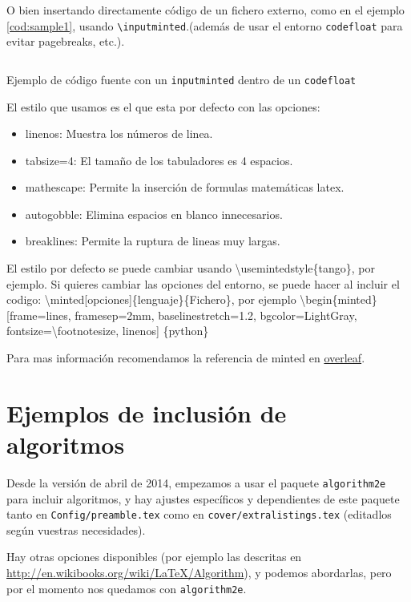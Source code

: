 O bien insertando directamente código de un fichero externo, como en el ejemplo
\ref{cod:sample1}, usando \texttt{\textbackslash{}inputminted}.(además de usar
el entorno \texttt{codefloat} para evitar pagebreaks, etc.).

\begin{codefloat}
\inputminted{c}{appendix/function.c}
\caption{Ejemplo de código fuente con un \texttt{inputminted} dentro
de un \texttt{codefloat}}
\label{cod:sample1}
\end{codefloat}

El estilo que usamos es el que esta por defecto con las opciones:
\begin{itemize}
  \item linenos: Muestra los números de linea.
  \item tabsize=4: El tamaño de los tabuladores es 4 espacios.
  \item mathescape: Permite la inserción de formulas matemáticas latex.
  \item autogobble: Elimina espacios en blanco innecesarios.
  \item breaklines: Permite la ruptura de lineas muy largas.
\end{itemize}

El estilo por defecto se puede cambiar usando
\textbackslash{}{usemintedstyle\{tango\}}, por ejemplo. Si quieres cambiar las
opciones del entorno, se puede hacer al incluir el codigo:
\textbackslash{}{minted[opciones]\{lenguaje\}\{Fichero\}}, por ejemplo
\textbackslash{}{begin\{minted\}[frame=lines, framesep=2mm, baselinestretch=1.2, bgcolor=LightGray, fontsize=\textbackslash{}{footnotesize}, linenos] \{python\}}

Para mas información recomendamos la referencia de minted en
\href{https://es.overleaf.com/learn/latex/Code_Highlighting_with_minted}{overleaf}.

\section{Ejemplos de inclusión de algoritmos}
\label{sec:algoritmos}

Desde la versión de abril de 2014, empezamos a usar el paquete
\texttt{algorithm2e} para incluir algoritmos, y hay ajustes específicos
y dependientes de este paquete tanto en \texttt{Config/preamble.tex}
como en \texttt{cover/extralistings.tex} (editadlos según vuestras
necesidades). 

Hay otras opciones disponibles (por ejemplo las descritas en
\url{http://en.wikibooks.org/wiki/LaTeX/Algorithm}), y podemos
abordarlas, pero por el momento nos quedamos con \texttt{algorithm2e}.

